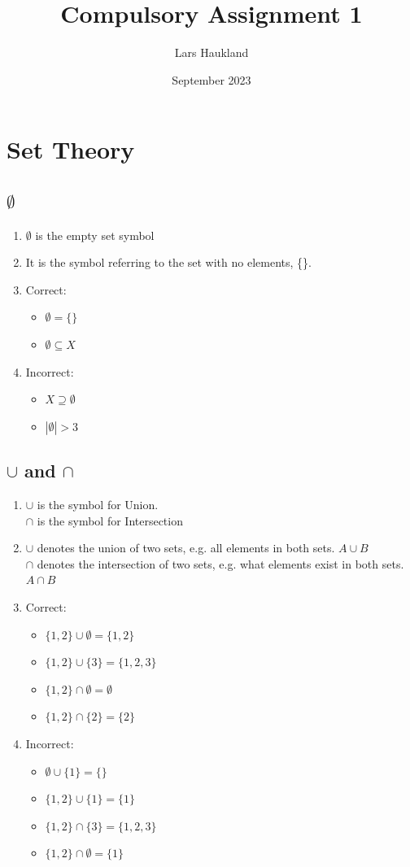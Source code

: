 \documentclass{article}
\title{Compulsory Assignment 1}
\author{Lars Haukland}
\date{September 2023}
\begin{document}
\maketitle
\section{Set Theory}
\subsection{$\emptyset$}
\begin{enumerate}
    \item $\emptyset$ is the empty set symbol
    \item  It is the symbol referring to the set with no elements, \{\}.
    \item Correct:
    \begin{itemize}
        \item $\emptyset = \{\}$
        \item $\emptyset \subseteq X$
    \end{itemize}
    \item Incorrect:
    \begin{itemize}
        \item $X \supseteq \emptyset$
        \item $|\emptyset| > 3$
    \end{itemize}
\end{enumerate}

\subsection{$\cup$ and $\cap$}
\begin{enumerate}
    \item $\cup$ is the symbol for Union. \\
          $\cap$ is the symbol for Intersection
    \item $\cup$ denotes the union of two sets, e.g. all elements in both sets. $A \cup B$ \\
          $\cap$ denotes the intersection of two sets, e.g. what elements exist in both sets. $A \cap B$
    \item Correct:
    \begin{itemize}
        \item $\{1,2\} \cup \emptyset = \{1,2\}$
        \item $\{1,2\} \cup \{3\} = \{1,2,3\}$
        \item $\{1,2\} \cap \emptyset = \emptyset$
        \item $\{1,2\} \cap \{2\} = \{2\}$
    \end{itemize}
    \item Incorrect:
    \begin{itemize}
        \item $\emptyset \cup \{1\} = \{\}$
        \item $\{1,2\} \cup \{1\} = \{1\}$
        \item $\{1,2\} \cap \{3\} = \{1,2,3\}$
        \item $\{1,2\} \cap \emptyset = \{1\}$
    \end{itemize}
\end{enumerate}
\end{document}
